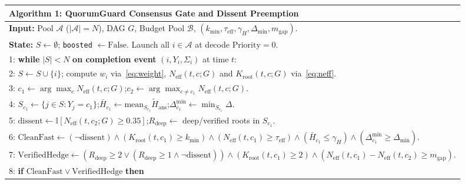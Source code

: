 \documentclass[conference]{IEEEtran}
\def\QG{QuorumGuard}%
\theoremstyle{definition}
\theoremstyle{remark}
\newcommand{\QG}{\textsc{QuorumGuard}}
\newcommand{\Neff}{N_{\mathrm{eff}}}
\newcommand{\Htilde}{\tilde{H}_{\mathrm{ans}}}
\newcommand{\Ind}{\mathbb{I}}
\begin{document}
\begin{figure}[!t]
\centering
\scriptsize
\renewcommand{\arraystretch}{1.04}
\begin{tabular}{|p{}|}
\hline
\textbf{Algorithm 1:} \QG{} Consensus Gate and Dissent Preemption \\
\hline
\textbf{Input:} Pool $\mathcal{A}$ ($|\mathcal{A}|=N$), DAG $G$, Budget Pool $\mathcal{B}$, $(k_{\min}, \tau_{\mathrm{eff}}, \gamma_H, \Delta_{\min}, m_{\mathrm{gap}})$. \\
\textbf{State:} $S \leftarrow \emptyset$; \texttt{boosted} $\leftarrow \mathrm{False}$. Launch all $i \in \mathcal{A}$ at decode $\mathrm{Priority} = 0$. \\
1: \textbf{while} $|S| < N$ \textbf{on completion event} $(i, Y_i, \Sigma_i)$ at time $t$: \\
2: \hspace{1em} $S \leftarrow S \cup \{i\}$; compute $w_i$ via~\eqref{eq:weight}, $\Neff(t, c; G)$ and $K_{\mathrm{root}}(t, c; G)$ via~\eqref{eq:neff}. \\
3: \hspace{1em} $c_1 \leftarrow \arg\max_c \Neff(t, c; G)$;\quad $c_2 \leftarrow \arg\max_{c \neq c_1} \Neff(t, c; G)$. \\
4: \hspace{1em} $S_{c_1} \leftarrow \{j \in S : Y_j = c_1\}$;\quad $\bar{H}_{c_1} \leftarrow \mathrm{mean}_{S_{c_1}} \Htilde$;\quad $\Delta_{c_1}^{\min} \leftarrow \min_{S_{c_1}} \Delta$. \\
5: \hspace{1em} $\mathrm{dissent} \leftarrow \Ind[\Neff(t, c_2; G) \ge 0.35]$;\quad $R_{\mathrm{deep}} \leftarrow$ deep/verified roots in $S_{c_1}$. \\
6: \hspace{1em} $\mathrm{CleanFast} \leftarrow (\neg\mathrm{dissent}) \wedge (K_{\mathrm{root}}(t, c_1) \ge k_{\min}) \wedge (\Neff(t, c_1) \ge \tau_{\mathrm{eff}}) \wedge (\bar{H}_{c_1} \le \gamma_H) \wedge (\Delta_{c_1}^{\min} \ge \Delta_{\min})$. \\
7: \hspace{1em} $\mathrm{VerifiedHedge} \leftarrow (R_{\mathrm{deep}} \ge 2 \vee (R_{\mathrm{deep}} \ge 1 \wedge \neg\mathrm{dissent})) \wedge (K_{\mathrm{root}}(t, c_1) \ge 2) \wedge (\Neff(t, c_1) - \Neff(t, c_2) \ge m_{\mathrm{gap}})$. \\
8: \hspace{0.65em} \textbf{if} $\mathrm{CleanFast} \vee \mathrm{VerifiedHedge}$ \textbf{then} \\

\end{tabular}
\end{figure}
\end{document}

